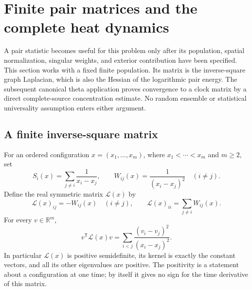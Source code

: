 
\section{Finite pair matrices and the complete heat dynamics}
\label{pm:section}

A pair statistic becomes useful for this problem only after its
population, spatial normalization, singular weights, and exterior
contribution have been specified.  This section works with a fixed finite
population.  Its matrix is the inverse-square graph Laplacian, which is
also the Hessian of the logarithmic pair energy.  The subsequent canonical
theta application proves convergence to a clock matrix by a direct
complete-source concentration estimate.  No random ensemble or statistical
universality assumption enters either argument.

\subsection{A finite inverse-square matrix}
\label{pm:matrix-subsection}

For an ordered configuration
\(x=(x_1,\ldots,x_m)\), where \(x_1<\cdots<x_m\) and \(m\ge2\), set
\begin{equation}
 S_i(x)=\sum_{j\ne i}\frac1{x_i-x_j},\qquad
 W_{ij}(x)=\frac1{(x_i-x_j)^2}\quad(i\ne j).
 \label{pm:S-and-W}
\end{equation}
Define the real symmetric matrix \(\mathcal L(x)\) by
\begin{equation}
 \mathcal L(x)_{ij}=-W_{ij}(x)\quad(i\ne j),\qquad
 \mathcal L(x)_{ii}=\sum_{j\ne i}W_{ij}(x).
 \label{pm:laplacian-definition}
\end{equation}
For every \(v\in\mathbb R^m\),
\begin{equation}
 v^{\mathsf T}\mathcal L(x)v
   =\sum_{i<j}\frac{(v_i-v_j)^2}{(x_i-x_j)^2}.
 \label{pm:quadratic-form}
\end{equation}
In particular \(\mathcal L(x)\) is positive semidefinite, its kernel is
exactly the constant vectors, and all its other eigenvalues are positive.
The positivity is a statement about a configuration at one time; by
itself it gives no sign for the time derivative of this matrix.


